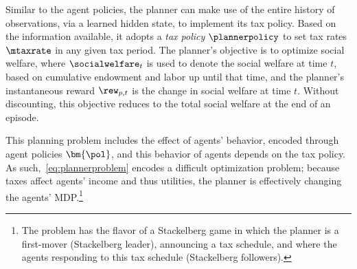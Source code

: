 Similar to the agent policies, the planner can make use of the entire history of observations, via a learned hidden state, to implement its tax policy.
Based on the information available, it adopts a {\em tax policy} $\plannerpolicy$ to set tax rates $\mtaxrate$ in any given tax period.
The planner's objective is to optimize social welfare,
where $\socialwelfare_t$ is used to denote the social welfare at time $t$, based on cumulative endowment and labor up until that time, and the planner's instantaneous reward $\rew_{p,t}$ is the change in social welfare at time $t$.
Without discounting, this objective reduces to the total social welfare at the end of an episode.

This planning problem includes the effect of agents' behavior, encoded through agent policies $\bm{\pol}$, and this behavior of agents depends on the tax policy.
As such,~\eqref{eq:plannerproblem} encodes a difficult optimization problem; because taxes affect agents' income and thus utilities, the planner is effectively changing the agents' MDP.\footnote{The problem has the flavor of a Stackelberg game in which  the planner is a first-mover (Stackelberg leader), announcing a tax schedule, and where the agents responding to this tax schedule (Stackelberg followers).}




